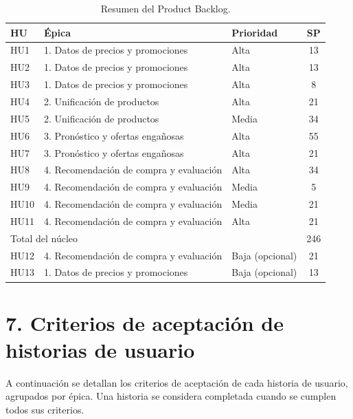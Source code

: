 \documentclass[
11pt, %
]{charter}
\begin{document}
\begin{table}[H]
\centering
\caption{Resumen del Product Backlog.}
\label{tab:backlog}
\begin{tabularx}{\linewidth}{@{}|l|X|l|c|@{}}
\hline
\rowcolor[HTML]{C0C0C0}
HU & Épica & Prioridad & SP \\ \hline
HU1 & 1. Datos de precios y promociones & Alta & 13 \\ \hline
HU2 & 1. Datos de precios y promociones & Alta & 13 \\ \hline
HU3 & 1. Datos de precios y promociones & Alta & 8 \\ \hline
HU4 & 2. Unificación de productos & Alta & 21 \\ \hline
HU5 & 2. Unificación de productos & Media & 34 \\ \hline
HU6 & 3. Pronóstico y ofertas engañosas & Alta & 55 \\ \hline
HU7 & 3. Pronóstico y ofertas engañosas & Alta & 21 \\ \hline
HU8 & 4. Recomendación de compra y evaluación & Alta & 34 \\ \hline
HU9 & 4. Recomendación de compra y evaluación & Media & 5 \\ \hline
HU10 & 4. Recomendación de compra y evaluación & Media & 21 \\ \hline
HU11 & 4. Recomendación de compra y evaluación & Alta & 21 \\ \hline
\multicolumn{3}{|l|}{Total del núcleo} & 246 \\ \hline
HU12 & 4. Recomendación de compra y evaluación & Baja (opcional) & 21 \\ \hline
HU13 & 1. Datos de precios y promociones & Baja (opcional) & 13 \\ \hline
\end{tabularx}
\end{table}

\section{7. Criterios de aceptación de historias de usuario}
\label{sec:criteriosAceptacion}

A continuación se detallan los criterios de aceptación de cada historia de usuario, agrupados por épica. Una historia se considera completada cuando se cumplen todos sus criterios.
\end{document}
